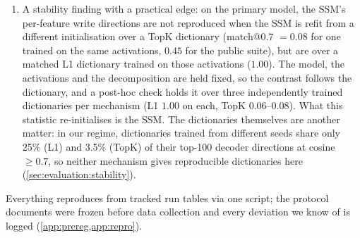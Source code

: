 \begin{enumerate}
    layer of depth gap, stable across refits and dictionaries (we also show
    that the per-layer spectral radius, which an earlier version of this work
    reported as gauge-invariant, is not). And the probe: compressions of the
    codes trained to reconstruct $\Delta$ keep answer-identity information
    that PCA of the same codes discards, also once a look-ahead in the codes
    is removed, but the cross-layer state keeps no more of it than the
    per-layer feedthrough's projection does
    (\cref{sec:evaluation:operator,sec:evaluation:probe}).
  \item A stability finding with a practical edge: on the primary model, the
    SSM's per-feature write directions are not reproduced when the SSM is
    refit from a different initialisation over a TopK dictionary (match@0.7
    $=0.08$ for one trained on the same activations, $0.45$ for the public
    suite), but are over a matched L1 dictionary trained on those activations
    ($1.00$). The model, the activations and the decomposition are held
    fixed, so the contrast follows the dictionary, and a post-hoc check holds
    it over three independently trained dictionaries per mechanism (L1 $1.00$
    on each, TopK $0.06$--$0.08$). What this statistic re-initialises is the
    SSM. The dictionaries themselves are another matter: in our regime,
    dictionaries trained from different seeds share only 25\% (L1) and 3.5\%
    (TopK) of their top-100 decoder directions at cosine $\ge 0.7$, so
    neither mechanism gives reproducible dictionaries here
    (\cref{sec:evaluation:stability}).
\end{enumerate}

Everything reproduces from tracked run tables via one script; the protocol
documents were frozen before data collection and every deviation we know of
is logged (\cref{app:prereg,app:repro}).
